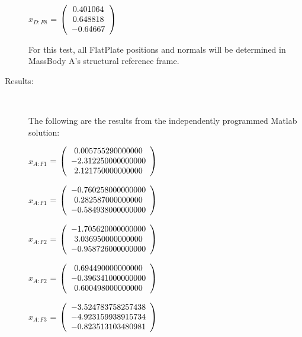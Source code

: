 \begin{description}
$\hat{x}_{D:F8}$ = $\left( \begin{array} {ccc}   0.401064 \\   0.648818 \\   -0.64667 
\end{array} \right)\\ \\$

For this test, all FlatPlate positions and normals will be determined in
MassBody A's structural reference frame.

\item[Results:] \ \newline

The following are the results from the independently programmed Matlab solution:

$x_{A:F1}$  = $\left( \begin{array} {ccc} 0.005755290000000 \\ -2.312250000000000 \\ 2.121750000000000
\end{array} \right)\\ \\$

$\hat{x}_{A:F1}$  = $\left( \begin{array} {ccc} -0.760258000000000 \\ 0.282587000000000 \\ -0.584938000000000
\end{array} \right)\\ \\$

$x_{A:F2}$  = $\left( \begin{array} {ccc} -1.705620000000000 \\ 3.036950000000000 \\ -0.958726000000000
\end{array} \right)\\ \\$

$\hat{x}_{A:F2}$  = $\left( \begin{array} {ccc} 0.694490000000000 \\ -0.396341000000000 \\ 0.600498000000000                                                        
\end{array} \right)\\ \\$

$x_{A:F3}$  = $\left( \begin{array} {ccc} -3.524783758257438 \\ -4.923159938915734 \\ -0.823513103480981
\end{array} \right)\\ \\$


\end{description}
